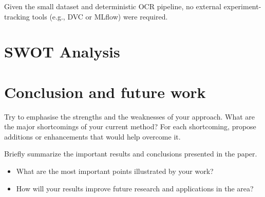 \documentclass[runningheads,a4paper,11pt]{report}
\begin{document}
Given the small dataset and deterministic OCR pipeline, no external experiment-tracking tools (e.g., DVC or MLflow) were required.






\chapter{SWOT Analysis}
\label{chapter:swot}




\chapter{Conclusion and future work}
\label{chapter:concl}

Try to emphasise the strengths and the weaknesses of your approach.
What are the major shortcomings of your current method? For each shortcoming, propose additions or enhancements that would help overcome it. 

Briefly summarize the important results and conclusions presented in the paper. 

\begin{itemize}
	\item What are the most important points illustrated by your work? 
	\item How will your results improve future research and applications in the area? 
\end{itemize}






\end{document}
